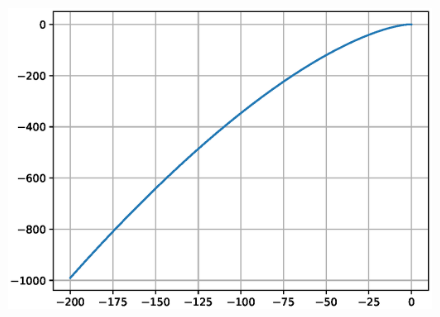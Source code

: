 \begin{enumerate}[label=\thesection.\arabic*.,ref=\thesection.\theenumi]
\begin{figure}
\centering
\includegraphics[width=\columnwidth]{./figs/ee18btech11002(b).eps}
\caption{}
\label{fig:inverse_polar_plot}
\end{figure}
\end{enumerate}
